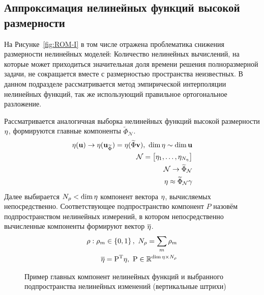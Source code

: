 \subsection{Аппроксимация нелинейных функций высокой размерности}

На Рисунке~\ref{fig:ROM-I} в том числе отражена проблематика снижения размерности нелинейных моделей: Количество нелинейных вычислений, на которые может приходиться значительная доля времени решения полноразмерной задачи, не сокращается вместе с размерностью пространства неизвестных. В данном подразделе рассматривается метод эмпирической интерполяции нелинейных функций, так же использующий правильное ортогональное разложение.

Рассматривается аналогичная выборка нелинейных функций высокой размерности $\mathbf{\eta}$, формируются главные компоненты $\widetilde{\Phi}_\mathcal{N}$.
\begin{align}
    \mathbf{\eta}(\mathbf{u}) \rightarrow \mathbf{\eta} (\mathbf{u}_{\widetilde{\Phi}}) = \mathbf{\eta} (\widetilde{\Phi} \mathbf{v}),~\dim{\mathbf{\eta}} \sim \dim{\mathbf{u}} \\
    \mathcal{N} =
    \begin{bmatrix}
        \mathbf{\eta}_1, \dots,  \mathbf{\eta}_{N_{\mathbf{\eta}}}
    \end{bmatrix} \\
    \mathcal{N} \rightarrow \widetilde{\Phi}_\mathcal{N} \\
    \mathbf{\eta} \approx \widetilde{\Phi}_\mathcal{N} \mathbf{\gamma}
\end{align}
Далее выбирается $N_{\mathbf{\rho}} < \dim{\mathbf{\eta}}$ компонент вектора $\mathbf{\eta}$, вычисляемых непосредственно. Соответствующее подпространство компонент $P$ назовём подпространством нелинейных измерений, в котором непосредственно вычисленные компоненты формируют вектор $\overline{\mathbf{\eta}}$.
\begin{align}
   \bvec{\rho} : \rho_m \in \left\{0, 1 \right\},~N_{\bvec{\rho}} = \sum_m \rho_m \\
   \overline{\nlin} = \transpose{P} \nlin,~\matr{P} \in \mathbb{R}^{\dim{\nlin} \times N_{\bvec{\rho}}}
\end{align}

\begin{figure}[ht]
    \caption{Пример главных компонент нелинейных функций и выбранного подпространства нелинейных изменений (вертикальные штрихи)~\cite{Elizarev2022}}\label{fig:gappy}
\end{figure}

